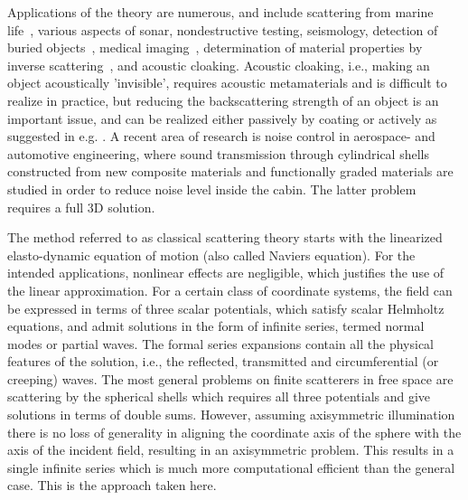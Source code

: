 

Applications of the theory are numerous, and include scattering from marine life~\cite{Stanton1998dbs, Stanton2000asb, Anderson1950ssf}, various aspects of sonar, nondestructive testing, seismology, detection of buried objects~\cite{Sessarego1998sba}, medical imaging~\cite{Wells2006ui}, determination of material properties by inverse scattering~\cite{Ayres1987ias}, and acoustic cloaking. Acoustic cloaking, i.e., making an object acoustically 'invisible', requires acoustic metamaterials and is difficult to realize in practice, but reducing the backscattering strength of an object is an important issue, and can be realized either passively by coating or actively as suggested in e.g. \cite{Avital2015ssa}. 
A recent area of research is noise control in aerospace- and automotive engineering, where sound transmission through cylindrical shells constructed from new composite materials \cite{Talebitooti2016att} and functionally graded materials \cite{Daneshjou2017aes} are studied in order to reduce noise level inside the cabin. The latter problem requires a full 3D solution. %


The method referred to as classical scattering theory starts with the linearized elasto-dynamic equation of motion (also called Naviers equation). For the intended applications, nonlinear effects are negligible, which justifies the use of the linear approximation. For a certain class of coordinate systems, the field can be expressed in terms of three scalar potentials, which satisfy scalar Helmholtz equations, and admit solutions in the form of infinite series, termed normal modes or partial waves. The formal series expansions contain all the physical features of the solution, i.e., the reflected, transmitted and circumferential (or creeping) waves. The most general problems on finite scatterers in free space are scattering by the spherical shells which requires all three potentials and give solutions in terms of double sums. However, assuming axisymmetric illumination there is no loss of generality in aligning the coordinate axis of the sphere with the axis of the incident field, resulting in an axisymmetric problem. This results in a single infinite series which is much more computational efficient than the general case. This is the approach taken here.
 
